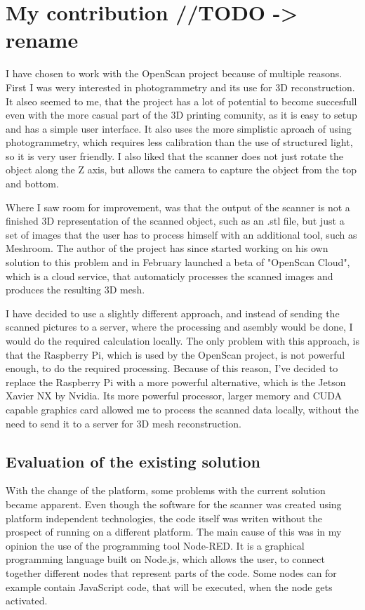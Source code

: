 \chapter{My contribution //TODO -> rename}
\label{sec:contribution}
I have chosen to work with the OpenScan project because of multiple reasons.
First I was wery interested in photogrammetry and its use for 3D reconstruction.
It alseo seemed to me, that the project has a lot of potential to become succesfull even with the more casual part of the 3D printing comunity, as it is easy to setup and has a simple user interface.
It also uses the more simplistic aproach of using photogrammetry, which requires less calibration than the use of structured light, so it is very user friendly.
I also liked that the scanner does not just rotate the object along the Z axis, but allows the camera to capture the object from the top and bottom.

Where I saw room for improvement, was that the output of the scanner is not a finished 3D representation of the scanned object, such as an .stl file, but just a set of images that the user has to process himself with an additional tool, such as Meshroom.
The author of the project has since started working on his own solution to this problem and in February launched a beta of "OpenScan Cloud", which is a cloud service, that automaticly processes the scanned images and produces the resulting 3D mesh. \cite{openscanCloud}

I have decided to use a slightly different approach, and instead of sending the scanned pictures to a server, where the processing and asembly would be done, I would do the required calculation locally.
The only problem with this approach, is that the Raspberry Pi, which is used by the OpenScan project, is not powerful enough, to do the required processing.
Because of this reason, I've decided to replace the Raspberry Pi with a more powerful alternative, which is the Jetson Xavier NX by Nvidia.
Its more powerful processor, larger memory and CUDA capable graphics card allowed me to process the scanned data locally, without the need to send it to a server for 3D mesh reconstruction.

\section{Evaluation of the existing solution}
With the change of the platform, some problems with the current solution became apparent.
Even though the software for the scanner was created using platform independent technologies, the code itself was writen without the prospect of running on a different platform.
The main cause of this was in my opinion the use of the programming tool Node-RED.
It is a graphical programming language built on Node.js, which allows the user, to connect together different nodes that represent parts of the code. \cite{node-red}
Some nodes can for example contain JavaScript code, that will be executed, when the node gets activated.

